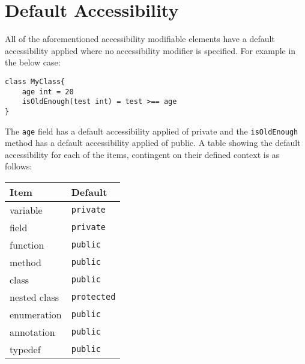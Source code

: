 \documentclass[conc-doc]{subfiles}
\begin{document}
\section{Default Accessibility}
All of the aforementioned accessibility modifiable elements have a default accessibility applied where no accessibility modifier is specified. For example in the below case:
\begin{lstlisting}
class MyClass{
	age int = 20
	isOldEnough(test int) = test >== age
}
\end{lstlisting}

The \lstinline{age} field has a default accessibility applied of private and the \lstinline{isOldEnough} method has a default accessibility applied of public. A table showing the default accessibility for each of the items, contingent on their defined context is as follows:

\begin{table}[H]
	\centering
	\begin{tabular}{ll}
		\hline
		Item&Default\\
		\hline
		variable&\lstinline!private!\\
		field&\lstinline!private!\\
		function&\lstinline!public!\\
		method&\lstinline!public!\\
		class&\lstinline!public!\\
		nested class&\lstinline!protected!\\
		enumeration&\lstinline!public!\\
		annotation&\lstinline!public!\\
		typedef&\lstinline!public!\\
		\hline
	\end{tabular}%
\end{table}
\end{document}
